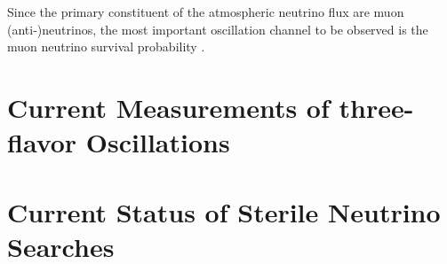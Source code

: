 Since the primary constituent of the atmospheric neutrino flux are muon (anti-)neutrinos, the most important oscillation channel to be observed is the muon neutrino survival probability .
\section{Current Measurements of three-flavor Oscillations}
\section{Current Status of Sterile Neutrino Searches}
